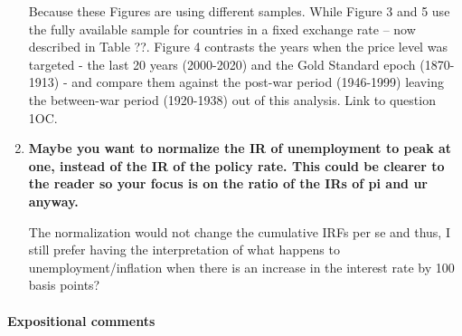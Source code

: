 \documentclass[12pt]{article}
\begin{document}
\begin{enumerate}
Because these Figures are using different samples. While Figure 3 and 5 use the fully available sample for countries in a fixed exchange rate – now described in Table ??. Figure 4 contrasts the years when the price level was targeted - the last 20 years (2000-2020) and the Gold Standard epoch (1870-1913) - and compare them against the post-war period (1946-1999) leaving the between-war period (1920-1938) out of this analysis. Link to question 1OC.

\item \textbf{Maybe you want to normalize the IR of unemployment to peak at one, instead of the IR of the policy rate. This could be clearer to the reader so your focus is on the ratio of the IRs of pi and ur anyway.}

The normalization would not change the cumulative IRFs per se and thus, I still prefer having the interpretation of what happens to unemployment/inflation when there is an increase in the interest rate by 100 basis points?

\end{enumerate}

\paragraph{Expositional comments}
\end{document}
